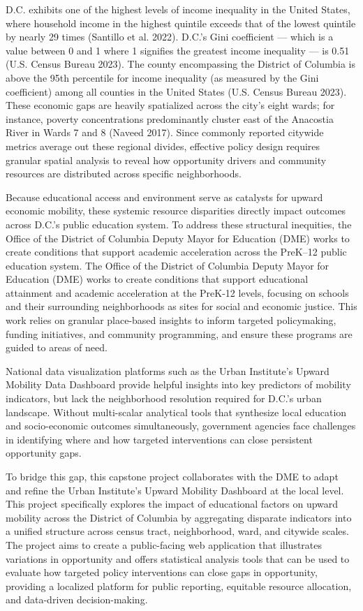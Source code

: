 \documentclass[
  letterpaper,
  DIV=11,
  numbers=noendperiod]{scrartcl}
\begin{document}
D.C. exhibits one of the highest levels of income inequality in the
United States, where household income in the highest quintile exceeds
that of the lowest quintile by nearly 29 times (Santillo et al. 2022).
D.C.'s Gini coefficient --- which is a value between 0 and 1 where 1
signifies the greatest income inequality --- is 0.51 (U.S. Census Bureau
2023). The county encompassing the District of Columbia is above the
95th percentile for income inequality (as measured by the Gini
coefficient) among all counties in the United States (U.S. Census Bureau
2023). These economic gaps are heavily spatialized across the city's
eight wards; for instance, poverty concentrations predominantly cluster
east of the Anacostia River in Wards 7 and 8 (Naveed 2017). Since
commonly reported citywide metrics average out these regional divides,
effective policy design requires granular spatial analysis to reveal how
opportunity drivers and community resources are distributed across
specific neighborhoods.

Because educational access and environment serve as catalysts for upward
economic mobility, these systemic resource disparities directly impact
outcomes across D.C.'s public education system. To address these
structural inequities, the Office of the District of Columbia Deputy
Mayor for Education (DME) works to create conditions that support
academic acceleration across the PreK--12 public education system. The
Office of the District of Columbia Deputy Mayor for Education (DME)
works to create conditions that support educational attainment and
academic acceleration at the PreK-12 levels, focusing on schools and
their surrounding neighborhoods as sites for social and economic
justice. This work relies on granular place-based insights to inform
targeted policymaking, funding initiatives, and community programming,
and ensure these programs are guided to areas of need.

National data visualization platforms such as the Urban Institute's
Upward Mobility Data Dashboard provide helpful insights into key
predictors of mobility indicators, but lack the neighborhood resolution
required for D.C.'s urban landscape. Without multi-scalar analytical
tools that synthesize local education and socio-economic outcomes
simultaneously, government agencies face challenges in identifying where
and how targeted interventions can close persistent opportunity gaps.

To bridge this gap, this capstone project collaborates with the DME to
adapt and refine the Urban Institute's Upward Mobility Dashboard at the
local level. This project specifically explores the impact of
educational factors on upward mobility across the District of Columbia
by aggregating disparate indicators into a unified structure across
census tract, neighborhood, ward, and citywide scales. The project aims
to create a public-facing web application that illustrates variations in
opportunity and offers statistical analysis tools that can be used to
evaluate how targeted policy interventions can close gaps in
opportunity, providing a localized platform for public reporting,
equitable resource allocation, and data-driven decision-making.
\end{document}
